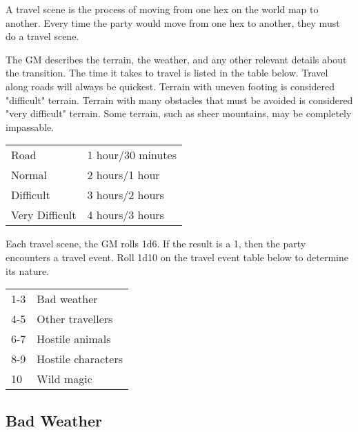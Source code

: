 \begin{multicols}{2}
A travel scene is the process of moving from one hex on the world map
to another. Every time the party would move from one hex to another,
they must do a travel scene.

The GM describes the terrain, the weather, and any other relevant
details about the transition. The time it takes to travel is listed
in the table below. Travel along roads will always be quickest. Terrain
with uneven footing is considered "difficult" terrain. Terrain with many
obstacles that must be avoided is considered "very difficult" terrain.
Some terrain, such as sheer mountains, may be completely impassable.

\begin{center}
{
\begin{xtabular}{|l|l|}
Road & 1 hour/30 minutes \\
Normal & 2 hours/1 hour \\
Difficult & 3 hours/2 hours \\
Very Difficult & 4 hours/3 hours \\
\hline
\end{xtabular}
}
\end{center}

Each travel scene, the GM rolls 1d6. If the result is a 1, then the
party encounters a travel event. Roll 1d10 on the travel event table below
to determine its nature.

\begin{center}
{
\begin{xtabular}{|l|l|}
1-3 & Bad weather \\
4-5 & Other travellers \\
6-7 & Hostile animals \\
8-9 & Hostile characters \\
10 & Wild magic \\
\hline
\end{xtabular}
}
\end{center}

\subsection{Bad Weather}


\end{multicols}
